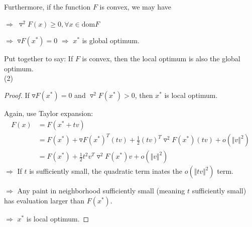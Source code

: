 Furthermore, if the function $F$ is convex, we may have

$\Rightarrow$ $\triangledown^2F(x)\geq0, \forall x\in \text{dom}F$

$\Rightarrow$ $\triangledown F(x^*) = 0$ $\Rightarrow$ $x^*$ is global optimum.

Put together to say: If $F$ is convex, then the local optimum is also the global optimum.\\

\vspace{0.3cm}
(2)
\begin{proof}
	If $\triangledown F(x^*) = 0$ and $\triangledown^2 F(x^*) > 0$, then $x^*$ is local optimum.
	
	Again, use Taylor expansion: 
	\begin{align*}
	F(x) &= F(x^* + tv) \\
	&= F(x^*) + \triangledown F(x^*)^T(tv) + \frac{1}{2}(tv)^T\triangledown^2F(x^*)(tv) + o(\Vert v \Vert^2)\\
	&= F(x^*) + \frac{1}{2}t^2v^T\triangledown^2F(x^*)v + o(\Vert v \Vert^2)
	\end{align*}
	$\Rightarrow$ If $t$ is sufficiently small, the quadratic term inates the $o(\Vert tv \Vert^2)$ term.
	
	$\Rightarrow$ Any paint in neighborhood sufficiently small (meaning $t$ sufficiently small) has evaluation larger than $F(x^*)$.
	
	$\Rightarrow$ $x^*$ is local optimum. 
\end{proof}

